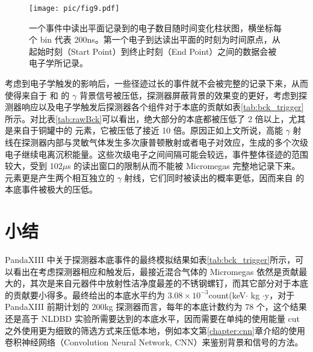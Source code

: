 \begin{figure}
    \centering
    \texttt{[image: pic/fig9.pdf]}
    \caption{一个事件中读出平面记录到的电子数目随时间变化柱状图，横坐标每个 bin 代表 200ns。第一个电子到达读出平面的时刻为时间原点，从起始时刻（Start Point）到终止时刻（End Point）之间的数据会被电子学所记录。}
    \label{fig:trigger}
\end{figure}

考虑到电子学触发的影响后，一些径迹过长的事件就不会被完整的记录下来，从而使得来自于 \utte 和 \thttt 的 $\gamma$ 背景信号被压低，探测器屏蔽背景的效果变的更好，考虑到探测器响应以及电子学触发后探测器各个组件对于本底的贡献如表\ref{tab:bck_trigger}所示。对比表\ref{tab:rawBck}可以看出，绝大部分的本底都被压低了 2 倍以上，尤其是来自于铜罐中的 \cose 元素，它被压低了接近 10 倍。原因正如上文所说，高能 $\gamma$ 射线在探测器内部与灵敏气体发生多次康普顿散射或者电子对效应，生成的多个次级电子继续电离沉积能量。这些次级电子之间间隔可能会较远，事件整体径迹的范围较大，受到 102$\mu$s 的读出窗口的限制从而不能被 Micromegas 完整地记录下来。\cose 元素更是产生两个相互独立的 $\gamma$ 射线，它们同时被读出的概率更低，因而来自 \cose 的本底事件被极大的压低。

\section{小结}

PandaXIII 中关于探测器本底事件的最终模拟结果如表\ref{tab:bck_trigger}所示，可以看出在考虑探测器相应和触发后，最接近混合气体的 Micromegas 依然是贡献最大的，其次是来自元器件中放射性洁净度最差的不锈钢螺钉，而其它部分对于本底的贡献要小得多。最终给出的本底水平约为 $3.08\times 10^{-3}$count\/(keV$\cdot$ kg $\cdot$y，对于 PandaXIII 前期计划的 200kg 探测器而言，每年的本底计数约为 78 个，这个结果还是高于 NLDBD 实验所需要达到的本底水平，因而需要在单纯的使用能量 cut 之外使用更为细致的筛选方式来压低本地，例如本文第\ref{chapter:cnn}章介绍的使用卷积神经网络（Convolution Neural Network, CNN）来鉴别背景和信号的方法。

